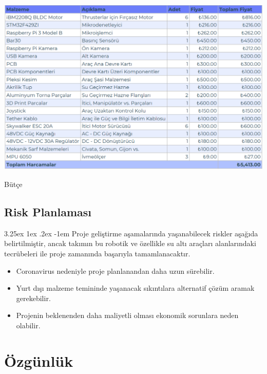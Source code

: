 \documentclass[12pt]{article}
\makeatletter
\renewcommand\paragraph{\@startsection{paragraph}{5}{\z@}%
  {3.25ex \@plus1ex \@minus.2ex}%
  {-1em}%
  {\normalfont\normalsize\bfseries}}
\makeatother
\begin{document}
\begin{table}[hbt!]
\centering
\includegraphics[width=1\textwidth]{budget.png}
\caption{Bütçe}
\label{fig:butce}
\end{table}

\subsection{Risk Planlaması}

\paragraph{} Proje geliştirme aşamalarında yaşanabilecek riskler aşağıda belirtilmiştir, ancak takımın bu robotik ve özellikle su altı araçları alanlarındaki tecrübeleri ile proje zamanında başarıyla tamamlanacaktır.

\begin{itemize}
    \item Coronavirus nedeniyle proje planlanandan daha uzun sürebilir.
    \item Yurt dışı malzeme temininde yaşanacak sıkıntılara alternatif çözüm aramak gerekebilir.
    \item Projenin beklenenden daha maliyetli olması ekonomik sorunlara neden olabilir.
\end{itemize}
\newpage
\section{Özgünlük}

\end{document}

